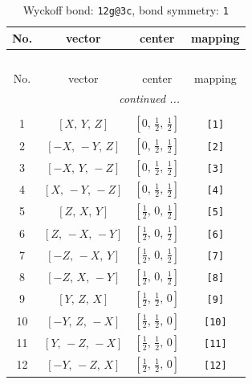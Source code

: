 \documentclass[fleqn,8pt]{jsarticle}
\begin{document}
\begin{longtable}{cccc}
\caption{Wyckoff bond: {\tt 12g@3c}, bond symmetry: {\tt 1}}
 \\
 \hline \hline
No. & vector & center & mapping \\ \hline \endfirsthead

\multicolumn{3}{l}{\tablename\ \thetable{}} \\
 \hline \hline
No. & vector & center & mapping \\ \hline \endhead

 \hline \hline
\multicolumn{3}{r}{\footnotesize\it continued ...} \\ \endfoot

 \hline \hline
\multicolumn{3}{r}{} \\ \endlastfoot

1 & $\left[ X,\, Y,\, Z \right]$ & $\left[ 0,\, \frac{1}{2},\, \frac{1}{2} \right]$ & {\tt [1]} \\ \hline
2 & $\left[ - X,\, - Y,\, Z \right]$ & $\left[ 0,\, \frac{1}{2},\, \frac{1}{2} \right]$ & {\tt [2]} \\ \hline
3 & $\left[ - X,\, Y,\, - Z \right]$ & $\left[ 0,\, \frac{1}{2},\, \frac{1}{2} \right]$ & {\tt [3]} \\ \hline
4 & $\left[ X,\, - Y,\, - Z \right]$ & $\left[ 0,\, \frac{1}{2},\, \frac{1}{2} \right]$ & {\tt [4]} \\ \hline
5 & $\left[ Z,\, X,\, Y \right]$ & $\left[ \frac{1}{2},\, 0,\, \frac{1}{2} \right]$ & {\tt [5]} \\ \hline
6 & $\left[ Z,\, - X,\, - Y \right]$ & $\left[ \frac{1}{2},\, 0,\, \frac{1}{2} \right]$ & {\tt [6]} \\ \hline
7 & $\left[ - Z,\, - X,\, Y \right]$ & $\left[ \frac{1}{2},\, 0,\, \frac{1}{2} \right]$ & {\tt [7]} \\ \hline
8 & $\left[ - Z,\, X,\, - Y \right]$ & $\left[ \frac{1}{2},\, 0,\, \frac{1}{2} \right]$ & {\tt [8]} \\ \hline
9 & $\left[ Y,\, Z,\, X \right]$ & $\left[ \frac{1}{2},\, \frac{1}{2},\, 0 \right]$ & {\tt [9]} \\ \hline
10 & $\left[ - Y,\, Z,\, - X \right]$ & $\left[ \frac{1}{2},\, \frac{1}{2},\, 0 \right]$ & {\tt [10]} \\ \hline
11 & $\left[ Y,\, - Z,\, - X \right]$ & $\left[ \frac{1}{2},\, \frac{1}{2},\, 0 \right]$ & {\tt [11]} \\ \hline
12 & $\left[ - Y,\, - Z,\, X \right]$ & $\left[ \frac{1}{2},\, \frac{1}{2},\, 0 \right]$ & {\tt [12]} \\
\end{longtable}
\end{document}
